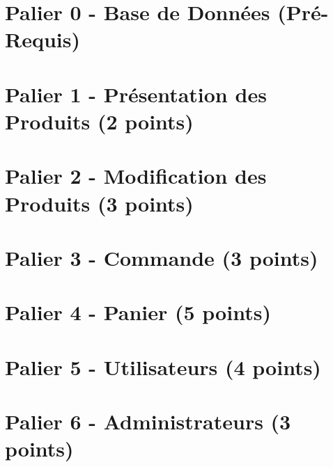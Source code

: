 \documentclass[12pt,a4paper]{article}
\begin{document}
\section{Palier 0 - Base de Données (Pré-Requis)}

\vspace*{0.7cm}



\newpage

\section{Palier 1 - Présentation des Produits (2 points)}

\vspace*{0.7cm}



\newpage

\section{Palier 2 - Modification des Produits (3 points)}

\vspace*{0.7cm}



\newpage

\section{Palier 3 - Commande (3 points)}

\vspace*{0.7cm}



\newpage

\section{Palier 4 - Panier (5 points)}

\vspace*{0.7cm}



\newpage

\section{Palier 5 - Utilisateurs (4 points)}

\vspace*{0.7cm}



\newpage

\section{Palier 6 - Administrateurs (3 points)}

\vspace*{0.7cm}


\end{document}
